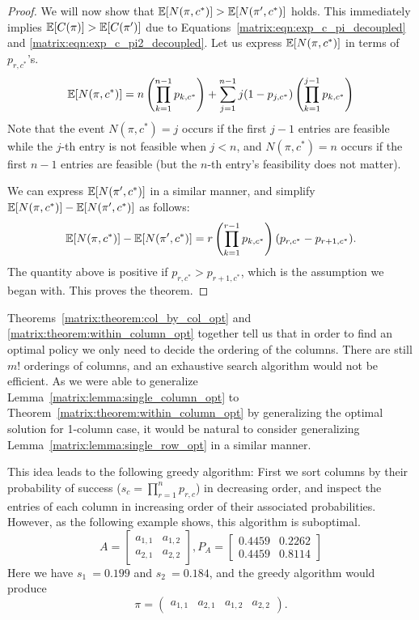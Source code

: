 \begin{proof}
 	We will now show that $\mathbb{E}[N(\pi, c^*)] > \mathbb{E}[N(\pi', c^*)]$ holds. 
 	This immediately implies $\mathbb{E}[C(\pi)] > \mathbb{E}[C(\pi')]$ due to Equations~\ref{matrix:eqn:exp_c_pi_decoupled} and \ref{matrix:eqn:exp_c_pi2_decoupled}.
 	Let us express $\mathbb{E}[N(\pi, c^*)]$ in terms of $p_{r,c^*}$'s.
 	\begin{equation*}
 		\mathbb{E}[N(\pi, c^*)] = n\left( \prod_{k=1}^{n-1} p_{k,c^*}\right) + 
 		\sum_{j=1}^{n-1} j (1-p_{j,c^*}) \left( \prod_{k=1}^{j-1} p_{k,c^*} \right)
 	\end{equation*}
 	Note that the event $N(\pi, c^*) = j$ occurs if the first $j-1$ entries are feasible while the $j$-th entry is not feasible when $j < n$, and $N(\pi, c^*) = n$ occurs if the first $n-1$ entries are feasible (but the $n$-th entry's feasibility does not matter).
	
 	We can express $\mathbb{E}[N(\pi', c^*)]$ in a similar manner, and simplify  $\mathbb{E}[N(\pi, c^*)] - \mathbb{E}[N(\pi', c^*)]$ as follows:
 	\small
 	\begin{equation*}
 		\mathbb{E}[N(\pi, c^*)] - \mathbb{E}[N(\pi', c^*)] = 
 		r \left( \prod_{k=1}^{r-1} p_{k,c^*} \right) (p_{r,c^*} - p_{r+1,c^*}).
 	\end{equation*}
 	\normalsize
 	The quantity above is positive if $p_{r,c^*} > p_{r+1,c^*}$, which is the assumption we began with.
 	This proves the theorem.
 \end{proof}


 Theorems~\ref{matrix:theorem:col_by_col_opt} and \ref{matrix:theorem:within_column_opt} together tell us that 
 in order to find an optimal policy we only need to decide the ordering of the columns. 
 There are still $m!$ orderings of columns, and an exhaustive search algorithm would not be efficient.
 As we were able to generalize Lemma~\ref{matrix:lemma:single_column_opt} to Theorem~\ref{matrix:theorem:within_column_opt} by generalizing the optimal solution for 1-column case, it would be natural to consider generalizing Lemma~\ref{matrix:lemma:single_row_opt} in a similar manner.

 This idea leads to the following greedy algorithm: First we sort columns by their probability of success ($s_c = \prod_{r=1}^{n} p_{r,c}$) in decreasing order, and inspect the entries of each column in increasing order of their associated probabilities. However, as the following example shows, this algorithm is suboptimal. 
 \begin{equation*}
 A = 
 	\begin{bmatrix}
 		a_{1,1}  & a_{1, 2} \\
 		a_{2,1}  & a_{2, 2}
 	\end{bmatrix},
 	P_A =
 	\begin{bmatrix}
 		0.4459  & 0.2262 \\
 		0.4459  & 0.8114
 	\end{bmatrix}
 \end{equation*}
 Here we have $s_1 ~= 0.199$ and $s_2 ~= 0.184$, and the greedy algorithm would produce 
 $$\pi = \begin{pmatrix} a_{1,1} & a_{2,1} & a_{1,2} & a_{2,2} \end{pmatrix}.$$ 

